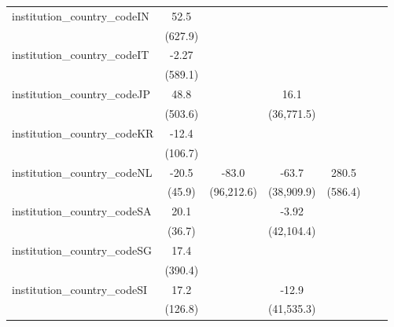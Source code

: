 \begin{tabular}{lcccccc}
   institution\_country\_codeIN          & 52.5        &             &             &               &             &   \\   
                                         & (627.9)     &             &             &               &             &   \\   
   institution\_country\_codeIT          & -2.27       &             &             &               &             &   \\   
                                         & (589.1)     &             &             &               &             &   \\   
   institution\_country\_codeJP          & 48.8        &             & 16.1        &               &             &   \\   
                                         & (503.6)     &             & (36,771.5)  &               &             &   \\   
   institution\_country\_codeKR          & -12.4       &             &             &               &             &   \\   
                                         & (106.7)     &             &             &               &             &   \\   
   institution\_country\_codeNL          & -20.5       & -83.0       & -63.7       & 280.5         &             &   \\   
                                         & (45.9)      & (96,212.6)  & (38,909.9)  & (586.4)       &             &   \\   
   institution\_country\_codeSA          & 20.1        &             & -3.92       &               &             &   \\   
                                         & (36.7)      &             & (42,104.4)  &               &             &   \\   
   institution\_country\_codeSG          & 17.4        &             &             &               &             &   \\   
                                         & (390.4)     &             &             &               &             &   \\   
   institution\_country\_codeSI          & 17.2        &             & -12.9       &               &             &   \\   
                                         & (126.8)     &             & (41,535.3)  &               &             &   \\   

\end{tabular}
